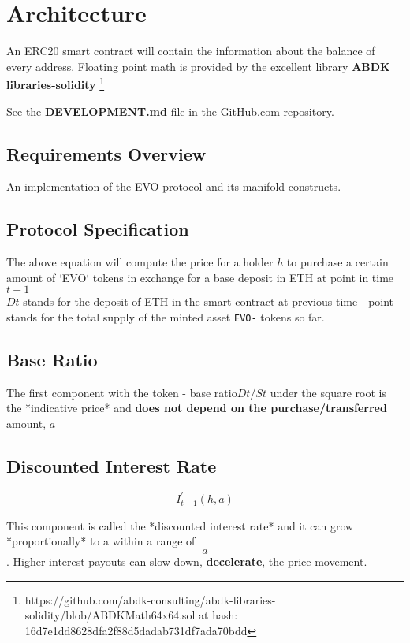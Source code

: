 \section{Architecture}


An ERC20 smart contract will contain the information about the balance of every address.
Floating point math is provided by the excellent library \textbf{ABDK libraries-solidity} 
\footnote{https://github.com/abdk-consulting/abdk-libraries-solidity/blob/ABDKMath64x64.sol at hash: 16d7e1dd8628dfa2f88d5dadab731df7ada70bdd }

See the \textbf{DEVELOPMENT.md} file in the GitHub.com repository.

\subsection{Requirements Overview}

An implementation of the EVO protocol and its manifold constructs.

\subsection{Protocol Specification}
The above equation will compute the price for a holder $h$ to purchase a certain amount of `EVO` tokens in exchange for a base deposit in ETH at point in time  $t +1$  \\
$Dt$ stands for the deposit of ETH in the smart contract at previous time - point %
stands for the total supply of the minted asset \texttt{EVO-} tokens so far.

\subsection{Base Ratio}
The first component with the token - base ratio\neweline $ Dt/St $ under the square root is the *indicative price* and \textbf{does not depend on the purchase/transferred} amount, $a$

\subsection{Discounted Interest Rate}
\begin{equation}
	I_{t+1}^{\prime}(h, a)
\end{equation}

This component is called the *discounted interest rate* and it can grow *proportionally* to a within a range of 
\begin{equation}
	[0, 0.24] a 
\end{equation}
.
Higher interest payouts can slow down, \textbf{decelerate}, the price movement. 

